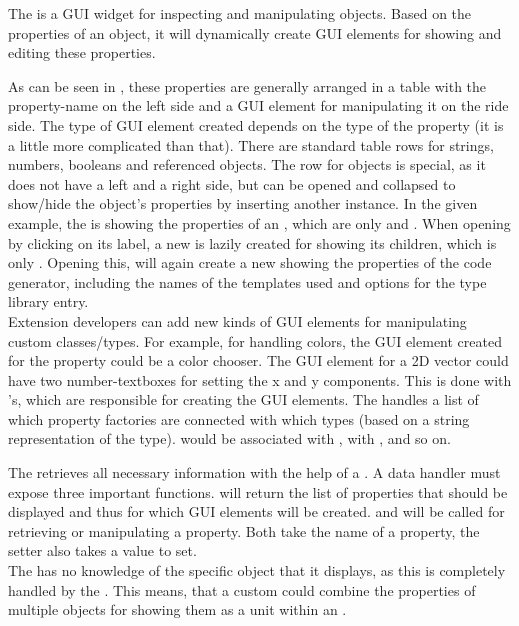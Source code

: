 The  is a GUI widget for inspecting and manipulating  objects. Based on the properties of an object, it will dynamically create GUI elements for showing and editing these properties.

As can be seen in , these properties are generally arranged in a table with the property-name on the left side and a GUI element for manipulating it on the ride side. The type of GUI element created depends on the type of the property (it is a little more complicated than that). There are standard table rows for strings, numbers, booleans and referenced objects. The row for objects is special, as it does not have a left and a right side, but can be opened and collapsed to show/hide the object's properties by inserting another  instance. In the given example, the  is showing the properties of an , which are only  and . When opening  by clicking on its label, a new  is lazily created for showing its children, which is only . Opening this, will again create a new  showing the properties of the code generator, including the names of the templates used and options for the type library entry.\\
Extension developers can add new kinds of GUI elements for manipulating custom classes/types. For example, for handling colors, the GUI element created for the property could be a color chooser. The GUI element for a 2D vector could have two number-textboxes for setting the x and y components. This is done with 's, which are responsible for creating the GUI elements. The  handles a list of which property factories are connected with which types (based on a string representation of the type).  would be associated with ,  with , and so on. 

The  retrieves all necessary information with the help of a . A data handler must expose three important functions.  will return the list of properties that should be displayed and thus for which GUI elements will be created.  and  will be called for retrieving or manipulating a property. Both take the name of a property, the setter also takes a value to set.\\
The  has no knowledge of the specific  object that it displays, as this is completely handled by the . This means, that a custom  could combine the properties of multiple objects for showing them as a unit within an .

